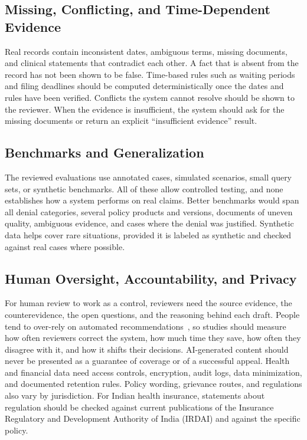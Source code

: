 \documentclass[conference]{IEEEtran}
\begin{document}
\subsection{Missing, Conflicting, and Time-Dependent Evidence}
Real records contain inconsistent dates, ambiguous terms, missing documents, and clinical statements that contradict each other. A fact that is absent from the record has not been shown to be false. Time-based rules such as waiting periods and filing deadlines should be computed deterministically once the dates and rules have been verified. Conflicts the system cannot resolve should be shown to the reviewer. When the evidence is insufficient, the system should ask for the missing documents or return an explicit ``insufficient evidence'' result.

\subsection{Benchmarks and Generalization}
The reviewed evaluations use annotated cases, simulated scenarios, small query sets, or synthetic benchmarks. All of these allow controlled testing, and none establishes how a system performs on real claims. Better benchmarks would span all denial categories, several policy products and versions, documents of uneven quality, ambiguous evidence, and cases where the denial was justified. Synthetic data helps cover rare situations, provided it is labeled as synthetic and checked against real cases where possible.

\subsection{Human Oversight, Accountability, and Privacy}
For human review to work as a control, reviewers need the source evidence, the counterevidence, the open questions, and the reasoning behind each draft. People tend to over-rely on automated recommendations~\cite{parasuraman2010}, so studies should measure how often reviewers correct the system, how much time they save, how often they disagree with it, and how it shifts their decisions. AI-generated content should never be presented as a guarantee of coverage or of a successful appeal. Health and financial data need access controls, encryption, audit logs, data minimization, and documented retention rules. Policy wording, grievance routes, and regulations also vary by jurisdiction. For Indian health insurance, statements about regulation should be checked against current publications of the Insurance Regulatory and Development Authority of India (IRDAI) and against the specific policy.
\end{document}

